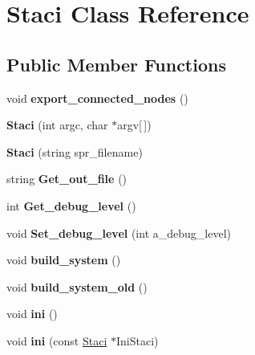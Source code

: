 \hypertarget{class_staci}{}\section{Staci Class Reference}
\label{class_staci}
\subsection*{Public Member Functions}
\begin{DoxyCompactItemize}
\item 
\hypertarget{class_staci_ac0b3fc6ab6ed135b47b004e0053b51a1}{}\label{class_staci_ac0b3fc6ab6ed135b47b004e0053b51a1} 
void {\bfseries export\+\_\+connected\+\_\+nodes} ()
\item 
\hypertarget{class_staci_a6f7ee7b08cba6b9a84a2472610fc9b30}{}\label{class_staci_a6f7ee7b08cba6b9a84a2472610fc9b30} 
{\bfseries Staci} (int argc, char $\ast$argv\mbox{[}$\,$\mbox{]})
\item 
\hypertarget{class_staci_ae470e416c7900fe47a198deb48faa173}{}\label{class_staci_ae470e416c7900fe47a198deb48faa173} 
{\bfseries Staci} (string spr\+\_\+filename)
\item 
\hypertarget{class_staci_a3b63425864b8bbc369a64e61803fe5fe}{}\label{class_staci_a3b63425864b8bbc369a64e61803fe5fe} 
string {\bfseries Get\+\_\+out\+\_\+file} ()
\item 
\hypertarget{class_staci_a60eb2cc5e192ece5607684d13252ea42}{}\label{class_staci_a60eb2cc5e192ece5607684d13252ea42} 
int {\bfseries Get\+\_\+debug\+\_\+level} ()
\item 
\hypertarget{class_staci_aae5279dcb5e5ac4543aa1bcf0b104da1}{}\label{class_staci_aae5279dcb5e5ac4543aa1bcf0b104da1} 
void {\bfseries Set\+\_\+debug\+\_\+level} (int a\+\_\+debug\+\_\+level)
\item 
\hypertarget{class_staci_a0153c20898e554922b15cee551a9f982}{}\label{class_staci_a0153c20898e554922b15cee551a9f982} 
void {\bfseries build\+\_\+system} ()
\item 
\hypertarget{class_staci_ac8690e5b15e90589d09bf72b07d24e5e}{}\label{class_staci_ac8690e5b15e90589d09bf72b07d24e5e} 
void {\bfseries build\+\_\+system\+\_\+old} ()
\item 
\hypertarget{class_staci_ad884bf7a487813b79d2a171cbfd0537a}{}\label{class_staci_ad884bf7a487813b79d2a171cbfd0537a} 
void {\bfseries ini} ()
\item 
\hypertarget{class_staci_ad52e09f1b75b48551ce5fbc8aad042cc}{}\label{class_staci_ad52e09f1b75b48551ce5fbc8aad042cc} 
void {\bfseries ini} (const \hyperlink{class_staci}{Staci} $\ast$Ini\+Staci)

\end{DoxyCompactItemize}
